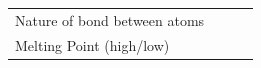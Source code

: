 \begin{enumerate}[noitemsep, label=\textbf{\arabic*}. ]
{\begin{tabular}[t]{|l|l|l|l|}
     \tabularnewline\cline{1-1}\cline{2-2}\cline{3-3}\cline{4-4}
    
    
        Nature of bond between atoms &
    
    
         &
    
    
         &
    
    
     \tabularnewline\cline{1-1}\cline{2-2}\cline{3-3}\cline{4-4}
    
    
        Melting Point (high/low) &
    
    
         &
    
    
         &
    
    

\end{tabular}}
\end{enumerate}
